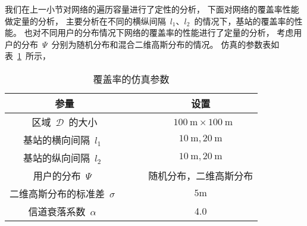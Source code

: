 我们在上一小节对网络的遍历容量进行了定性的分析，
下面对网络的覆盖率性能做定量的分析，
主要分析在不同的横纵间隔~$l_1$、$l_2$~的情况下，基站的覆盖率的性能。
也对不同用户的分布情况下网络的覆盖率的性能进行了定量的分析，
考虑用户的分布~$\Psi$~分别为随机分布和混合二维高斯分布的情况。
仿真的参数表如表~\ref{square_grid_pc_sim_para}~所示，
\begin{table}[htbp]
\caption{覆盖率的仿真参数}
\label{square_grid_pc_sim_para}
\vspace{0.5em}\centering\wuhao
\begin{tabular}{cccc}
\toprule[1.5pt]
参量 & & & 设置 \\
\midrule[0.5pt]
区域~$\mathcal{D}$~的大小  & & & ~$100~\mathrm{m} \times 100 ~\mathrm{m}$ \\
基站的横向间隔~$l_1$~ & & &  $10~\mathrm{m} , 20~\mathrm{m}$ \\
基站的纵向间隔~$l_2$~ & & &  $10~\mathrm{m} , 20~\mathrm{m}$ \\
用户的分布~$\Psi$~ & & & 随机分布，二维高斯分布\\
二维高斯分布的标准差~$\sigma$~ & & & ${5\mathrm{m}}$\\
信道衰落系数~$\alpha$~  & & & 4.0\\
\bottomrule[1.5pt]
\end{tabular}
\end{table}


